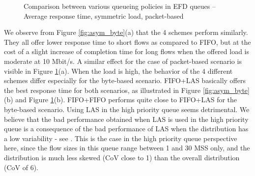 \documentclass[preprint,12pt]{elsarticle}
\begin{document}
\begin{figure}[ht!]
  \centering
  \caption{Comparison between various queueing policies in EFD  queues -- Average response time, symmetric load, packet-based}
  \label{fig:asym_pkt}
\end{figure}

We observe from Figure \ref{fig:asym_byte}(a) that the 4 schemes perform similarly. They all offer lower response time to short flows as compared to FIFO, but at the cost of  a slight increase of completion time for long flows when the offered load is moderate at 10 Mbit/s. A similar effect for the case of packet-based scenario is visible in Figure \ref{fig:asym_pkt}(a). When the load is high, the behavior of the 4 different schemes differ especially for the byte-based scenario. FIFO+LAS basically offers the best response time for both scenarios, as illustrated in Figure \ref{fig:asym_byte}(b) and Figure \ref{fig:asym_pkt}(b). FIFO+FIFO performs quite close to FIFO+LAS for the byte-based scenario. Using LAS in the high priority queue seems  detrimental. We believe that the bad performance obtained when LAS is used in the high priority queue is a consequence of the bad performance of LAS when the distribution has a low variability - see \cite{kleinrock_76_queueing}. This is the case in the high  priority queue perspective here, since the flow sizes in this queue range  between 1 and 30 MSS only, and the distribution is much less skewed (CoV close to 1) than the overall distribution (CoV of 6).  
\end{document}
